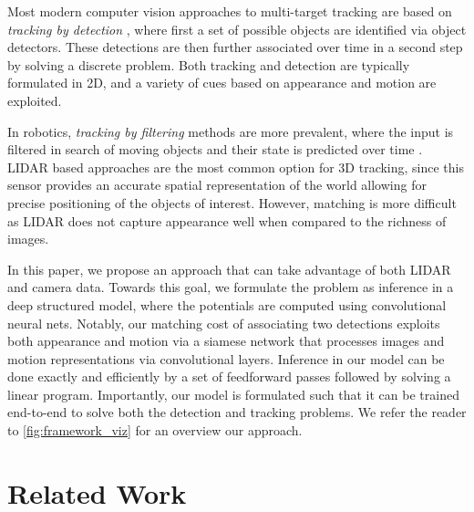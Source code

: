 \documentclass[letterpaper, 10 pt, conference]{ieeeconf}  \pdfminorversion=4
\begin{document}
Most modern computer vision approaches to multi-target tracking are based on \textit{tracking by detection} \cite{onlinemcf}, where first a set of possible objects are identified via   object detectors. These   detections are then further associated over time in a second step by solving a discrete problem.
Both tracking and detection are typically formulated in 2D, and a variety of cues based on appearance and motion are exploited.


In robotics, \textit{tracking by filtering} methods are more prevalent, where the input is filtered in search of moving objects and  their state is predicted over time \cite{thrun2005probabilistic}.
LIDAR based approaches are the most common option for 3D tracking, since this sensor provides an accurate spatial representation of the world allowing for precise positioning  of the objects of interest. However, matching is more difficult as  LIDAR does not capture appearance well when compared to the richness of images. 








In this paper, we propose an approach  that can take advantage of both  LIDAR and camera data. 
Towards this goal, we formulate the problem as inference in a deep structured model, where the potentials are computed using convolutional neural nets. Notably, our matching cost of associating two detections exploits both appearance and motion via a siamese network that processes images  and motion representations via convolutional layers. Inference in our model can be done exactly and efficiently by a set of feedforward passes followed by solving a linear program. Importantly, our model is formulated such that it can be trained end-to-end to solve both the detection and tracking problems. We refer the reader to \autoref{fig:framework_viz} for an overview our approach. 






 \section{Related Work}
\label{sec:related_work}
\end{document}
